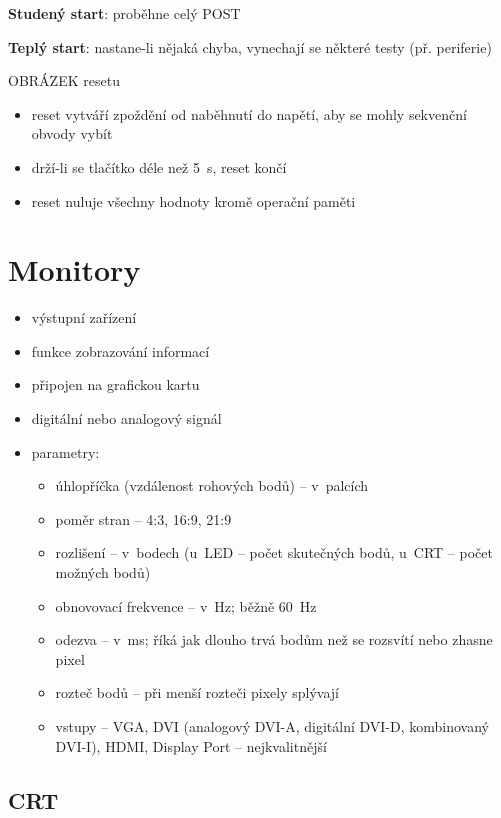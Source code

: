 \documentclass[a4paper,12pt]{article}
\providecommand{\tightlist}{%
\setlength{\itemsep}{0pt}\setlength{\parskip}{0pt}}
\begin{document}
\textbf{Studený start}: proběhne celý POST

\textbf{Teplý start}: nastane-li nějaká chyba, vynechají se některé testy (př. periferie)

OBRÁZEK resetu

\begin{itemize}
  \tightlist
  \item reset vytváří zpoždění od naběhnutí do napětí, aby se mohly sekvenční
  obvody vybít
  \item drží-li se tlačítko déle než 5~s, reset končí
  \item reset nuluje všechny hodnoty kromě operační paměti
\end{itemize}

\section{Monitory}

\begin{itemize}
  \tightlist
  \item výstupní zařízení
  \item funkce zobrazování informací
  \item připojen na grafickou kartu
  \item digitální nebo analogový signál
  \item parametry:
  \begin{itemize}
    \tightlist
    \item úhlopříčka (vzdálenost rohových bodů) -- v~palcích
    \item poměr stran -- 4:3, 16:9, 21:9
    \item rozlišení -- v~bodech (u~LED -- počet skutečných bodů, u~CRT -- počet
    možných bodů)
    \item obnovovací frekvence -- v~Hz; běžně 60~Hz
    \item odezva -- v~ms; říká jak dlouho trvá bodům než se rozsvítí nebo zhasne
    pixel
    \item rozteč bodů -- při menší rozteči pixely splývají
    \item vstupy -- VGA, DVI (analogový DVI-A, digitální DVI-D, kombinovaný DVI-I),
    HDMI, Display Port -- nejkvalitnější
  \end{itemize}
\end{itemize}

\subsection{CRT}
\end{document}
